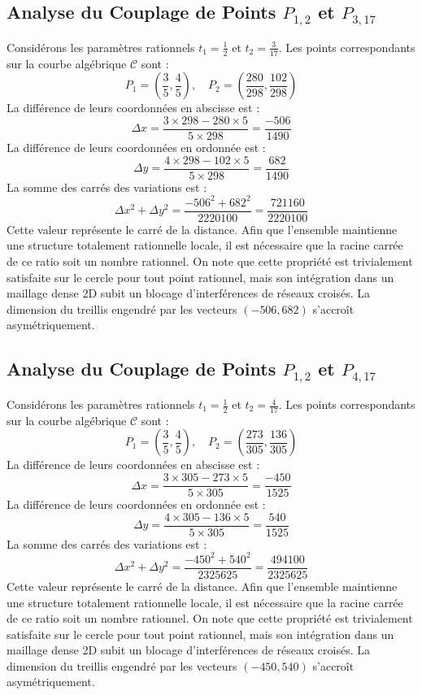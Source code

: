 \documentclass[12pt, a4paper]{article}
\begin{document}
\subsection{Analyse du Couplage de Points $P_{1,2}$ et $P_{3,17}$}
Considérons les paramètres rationnels $t_1 = \frac{1}{2}$ et $t_2 = \frac{3}{17}$.
Les points correspondants sur la courbe algébrique $\mathcal{C}$ sont :
$$ P_1 = \left( \frac{3}{5}, \frac{4}{5} \right), \quad P_2 = \left( \frac{280}{298}, \frac{102}{298} \right) $$
La différence de leurs coordonnées en abscisse est :
$$ \Delta x = \frac{3 \times 298 - 280 \times 5}{5 \times 298} = \frac{-506}{1490} $$
La différence de leurs coordonnées en ordonnée est :
$$ \Delta y = \frac{4 \times 298 - 102 \times 5}{5 \times 298} = \frac{682}{1490} $$
La somme des carrés des variations est :
$$ \Delta x^2 + \Delta y^2 = \frac{ -506^2 + 682^2 }{ 2220100 } = \frac{ 721160 }{ 2220100 } $$
Cette valeur représente le carré de la distance. Afin que l'ensemble maintienne une structure totalement rationnelle locale, il est nécessaire que la racine carrée de ce ratio soit un nombre rationnel. On note que cette propriété est trivialement satisfaite sur le cercle pour tout point rationnel, mais son intégration dans un maillage dense 2D subit un blocage d'interférences de réseaux croisés. La dimension du treillis engendré par les vecteurs $( -506, 682 )$ s'accroît asymétriquement.


\subsection{Analyse du Couplage de Points $P_{1,2}$ et $P_{4,17}$}
Considérons les paramètres rationnels $t_1 = \frac{1}{2}$ et $t_2 = \frac{4}{17}$.
Les points correspondants sur la courbe algébrique $\mathcal{C}$ sont :
$$ P_1 = \left( \frac{3}{5}, \frac{4}{5} \right), \quad P_2 = \left( \frac{273}{305}, \frac{136}{305} \right) $$
La différence de leurs coordonnées en abscisse est :
$$ \Delta x = \frac{3 \times 305 - 273 \times 5}{5 \times 305} = \frac{-450}{1525} $$
La différence de leurs coordonnées en ordonnée est :
$$ \Delta y = \frac{4 \times 305 - 136 \times 5}{5 \times 305} = \frac{540}{1525} $$
La somme des carrés des variations est :
$$ \Delta x^2 + \Delta y^2 = \frac{ -450^2 + 540^2 }{ 2325625 } = \frac{ 494100 }{ 2325625 } $$
Cette valeur représente le carré de la distance. Afin que l'ensemble maintienne une structure totalement rationnelle locale, il est nécessaire que la racine carrée de ce ratio soit un nombre rationnel. On note que cette propriété est trivialement satisfaite sur le cercle pour tout point rationnel, mais son intégration dans un maillage dense 2D subit un blocage d'interférences de réseaux croisés. La dimension du treillis engendré par les vecteurs $( -450, 540 )$ s'accroît asymétriquement.
\end{document}
